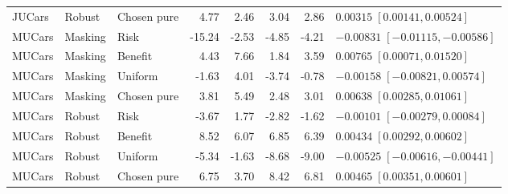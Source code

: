 \begin{table}[t]
\begin{tabular}{lllrrrrl}
JUCars & Robust & Chosen pure & 4.77 & 2.46 & 3.04 & 2.86 & $0.00315\;[0.00141,0.00524]$\\
MUCars & Masking & Risk & -15.24 & -2.53 & -4.85 & -4.21 & $-0.00831\;[-0.01115,-0.00586]$\\
MUCars & Masking & Benefit & 4.43 & 7.66 & 1.84 & 3.59 & $0.00765\;[0.00071,0.01520]$\\
MUCars & Masking & Uniform & -1.63 & 4.01 & -3.74 & -0.78 & $-0.00158\;[-0.00821,0.00574]$\\
MUCars & Masking & Chosen pure & 3.81 & 5.49 & 2.48 & 3.01 & $0.00638\;[0.00285,0.01061]$\\
MUCars & Robust & Risk & -3.67 & 1.77 & -2.82 & -1.62 & $-0.00101\;[-0.00279,0.00084]$\\
MUCars & Robust & Benefit & 8.52 & 6.07 & 6.85 & 6.39 & $0.00434\;[0.00292,0.00602]$\\
MUCars & Robust & Uniform & -5.34 & -1.63 & -8.68 & -9.00 & $-0.00525\;[-0.00616,-0.00441]$\\
MUCars & Robust & Chosen pure & 6.75 & 3.70 & 8.42 & 6.81 & $0.00465\;[0.00351,0.00601]$\\
\bottomrule
\end{tabular}
\end{table}
